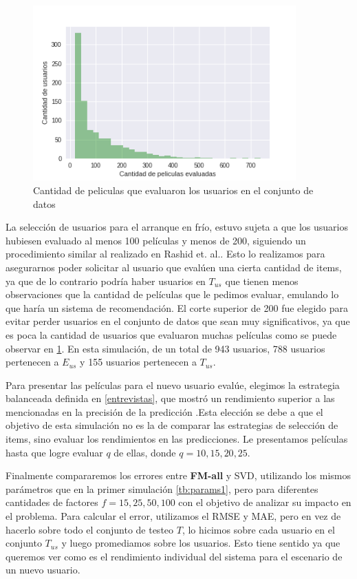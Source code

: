 \documentclass[hidelinks,12pt,a4paper]{book}
\theoremstyle{plain}
\theoremstyle{definition}
\begin{document}
\begin{figure}[ht]
\centering
\includegraphics[width=0.9\textwidth]{graficos/pelis-usuarios.png}
\caption{Cantidad de peliculas que evaluaron los usuarios en el conjunto de datos}\label{fig:usu-cantpelis}
\end{figure}

La selección de usuarios para el arranque en frío, estuvo sujeta a que los usuarios hubiesen evaluado al menos 100 películas y menos de 200, siguiendo un procedimiento similar al realizado en Rashid et. al.\cite{CS:rashid2008learning}. Esto lo realizamos para asegurarnos poder solicitar al usuario que evalúen una cierta cantidad de items, ya que de lo contrario podría haber usuarios en $T_{us}$ que tienen menos observaciones que la cantidad de películas que le pedimos evaluar, emulando lo que haría un sistema de recomendación. El corte superior de 200 fue elegido para evitar perder usuarios en el conjunto de datos que sean muy significativos, ya que es poca la cantidad de usuarios que evaluaron muchas películas como se puede observar en \ref{fig:usu-cantpelis}. En esta simulación, de un total de 943 usuarios, 788 usuarios pertenecen a $E_{us}$ y 155 usuarios pertenecen a $T_{us}$.

Para presentar las películas para el nuevo usuario evalúe, elegimos la estrategia balanceada definida en \ref{entrevistas}, que mostró un rendimiento superior a las mencionadas en la precisión de la predicción \cite{CS:rashid2002getting}.Esta elección se debe a que el objetivo de esta simulación no es la de comparar las estrategias de selección de items, sino evaluar los rendimientos en las predicciones. Le presentamos películas hasta que logre evaluar $q$ de ellas, donde $q = 10,15,20,25$.

Finalmente compararemos los errores entre \textbf{FM-all} y SVD, utilizando los mismos parámetros que en la primer simulación \ref{tb:params1}, pero para diferentes cantidades de factores $f=15,25,50,100$ con el objetivo de analizar su impacto en el problema. Para calcular el error, utilizamos el RMSE y MAE, pero en vez de hacerlo sobre todo el conjunto de testeo $T$, lo hicimos sobre cada usuario en el conjunto $T_{us}$ y luego promediamos sobre los usuarios. Esto tiene sentido ya que queremos ver como es el rendimiento individual del sistema para el escenario de un nuevo usuario. 
\end{document}
